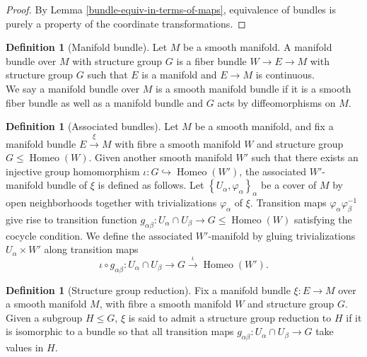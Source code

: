 \documentclass[reqno]{amsart}
\theoremstyle{definition}
\newtheorem{definition}[theorem]{Definition}
\theoremstyle{remark}
\DeclareMathOperator{\Homeo}{Homeo}
\begin{document}
\begin{proof}
    By Lemma \ref{bundle-equiv-in-terms-of-maps}, 
    equivalence of bundles is purely a property
    of the coordinate transformations.
\end{proof}






\newpage
\begin{definition}[Manifold bundle]
    Let $M$ be a smooth manifold. A
    manifold bundle over $M$ with structure group
    $G$ is a fiber
    bundle
    $W \to E \to M$ with
    structure group $G$ such that
    $E$ is a manifold and $E \to M$ is continuous.\\
    We say a manifold bundle over $M$ is a smooth
    manifold bundle if it is
    a smooth fiber bundle as well as
    a manifold bundle and $G$ acts by diffeomorphisms
    on $M$.
\end{definition}


    \begin{definition}[Associated bundles]
        Let $M$ be a smooth manifold, and
        fix a manifold bundle
        $E \stackrel{\xi}{\to } M$ with fibre a smooth
        manifold $W$ and structure group
        $G \le \Homeo (W)$. Given another smooth manifold
        $W'$ such that there exists an injective group
        homomorphism $\iota \colon G \hookrightarrow
        \Homeo\left( W' \right) $, the associated
        $W'$-manifold bundle of $\xi$ is defined
        as follows. Let
        $\left\{ U_{\alpha}, \varphi_{\alpha} \right\}_{\alpha}$ 
        be a cover of $M$ by open neighborhoods together with
        trivializations
        $\varphi_{\alpha}$ of $\xi$. Transition maps
        $\varphi_{\alpha} \varphi_{\beta}^{-1}$ give rise
        to transition function
        $g_{\alpha \beta} \colon U_{\alpha} \cap
        U_{\beta} \to G \le \Homeo(W)$ satisfying the
        cocycle condition. We define the associated
        $W'$-manifold by gluing trivializations
        $U_{\alpha} \times W'$ along transition maps
        \[
        \iota \circ g_{\alpha\beta} \colon U_{\alpha}
        \cap U_{\beta} \to G 
        \stackrel{\iota}{\to } \Homeo\left( W' \right) .
        \] 
    \end{definition}

    \begin{definition}[Structure group reduction]
        Fix a manifold bundle
        $\xi \colon E \to M$ over a smooth manifold
        $M$, with fibre a smooth manifold $W$ and structure
        group $G$. Given a subgroup $H \le G$, $\xi$ 
        is said to admit a structure group reduction to
        $H$ if it is isomorphic to a bundle so that all transition
        maps $g_{\alpha \beta} \colon U_{\alpha} \cap
        U_{\beta} \to G$ take values in $H$.
    \end{definition}
\end{document}
